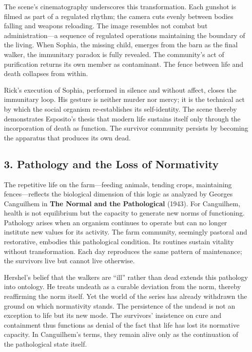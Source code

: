 \documentclass[11pt]{article}
\begin{document}
The scene’s cinematography underscores this transformation.  Each gunshot is filmed as part of a regulated rhythm; the camera cuts evenly between bodies falling and weapons reloading.  The image resembles not combat but administration—a sequence of regulated operations maintaining the boundary of the living.  When Sophia, the missing child, emerges from the barn as the final walker, the immunitary paradox is fully revealed.  The community’s act of purification returns its own member as contaminant.  The fence between life and death collapses from within.  

Rick’s execution of Sophia, performed in silence and without affect, closes the immunitary loop.  His gesture is neither murder nor mercy; it is the technical act by which the social organism re-establishes its self-identity.  The scene thereby demonstrates Esposito’s thesis that modern life sustains itself only through the incorporation of death as function.  The survivor community persists by becoming the apparatus that produces its own dead.  
\subsection*{3. Pathology and the Loss of Normativity}
\label{sec:orgfdb275e}

The repetitive life on the farm—feeding animals, tending crops, maintaining fences—reflects the biological dimension of this logic as analyzed by Georges Canguilhem in \textbf{The Normal and the Pathological} (1943).  For Canguilhem, health is not equilibrium but the capacity to generate new norms of functioning.  Pathology arises when an organism continues to operate but can no longer institute new values for its activity.  The farm community, seemingly pastoral and restorative, embodies this pathological condition.  Its routines sustain vitality without transformation.  Each day reproduces the same pattern of maintenance; the survivors live but cannot live otherwise.  

Hershel’s belief that the walkers are “ill” rather than dead extends this pathology into ontology.  He treats undeath as a curable deviation from the norm, thereby reaffirming the norm itself.  Yet the world of the series has already withdrawn the ground on which normativity stands.  The persistence of the undead is not an exception to life but its new mode.  The survivors’ insistence on cure and containment thus functions as denial of the fact that life has lost its normative capacity.  In Canguilhem’s terms, they remain alive only as the continuation of the pathological state itself.  
\end{document}
